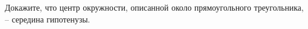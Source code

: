 \begin{ex}
	\begin{condition}
		Докажите, что центр окружности, описанной около	прямоугольного треугольника, – середина гипотенузы.
	\end{condition}
\end{ex}